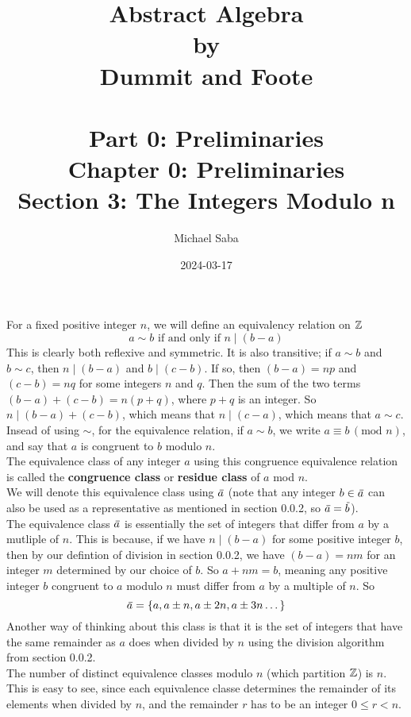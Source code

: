 \documentclass[12pt]{article}
\title{%
    \Huge Abstract Algebra \\
    \large by \\
    \Large Dummit and Foote \\~\\
    \huge Part 0: Preliminaries \\
    \LARGE Chapter 0: Preliminaries \\
    \Large Section 3: The Integers Modulo n
}
\date{2024-03-17}
\author{Michael Saba}
\begin{document}
    \maketitle
    \newpage    
    \setlength{\parindent}{0pt}

    For a fixed positive integer $n$,
    we will define an equivalency relation on $\mathbb{Z}$
    \[ a \sim b \text{ if and only if } n \mid (b - a) \]
    This is clearly both reflexive and symmetric.
    It is also transitive;
    if $a \sim b$ and $b \sim c$,
    then $n \mid (b-a)$ and $b \mid (c-b)$.
    If so, then $(b-a) = np$ and $(c-b) = nq$
    for some integers $n$ and $q$.
    Then the sum of the two terms $(b-a) + (c-b) = n(p+q)$,
    where $p+q$ is an integer.
    So $n \mid (b-a) + (c-b)$,
    which means that $n \mid (c-a)$,
    which means that $a \sim c$. \\
    Insead of using $\sim$,
    for the equivalence relation,
    if $a \sim b$,
    we write $a \equiv b \, (\text{mod }n)$,
    and say that $a$ is congruent to $b$ modulo $n$. \\
    The equivalence class of any integer $a$
    using this congruence equivalence relation
    is called the \textbf{congruence class} or \textbf{residue class}
    of $a$ mod $n$. \\
    We will denote this equivalence class using $\,\overline{\!{a}}$
    (note that any integer $b \in \,\overline{\!{a}}$ can also be used
    as a representative as mentioned in section 0.0.2,
    so $\,\overline{\!{a}} = \,\overline{\!{b}}$). \\

    The equivalence class $\,\overline{\!{a}}$ is essentially the set 
    of integers that differ from $a$ by a mutliple of $n$.
    This is because, if we have $n \mid (b - a)$
    for some positive integer $b$,
    then by our defintion of division in section 0.0.2,
    we have $(b-a) = nm$ for an integer $m$
    determined by our choice of $b$.
    So $a + nm = b$,
    meaning any positive integer $b$ congruent to $a$ modulo $n$
    must differ from $a$ by a multiple of $n$.
    So
    \[ \,\overline{\!{a}} = \{ a, a \pm n, a \pm 2n, a \pm 3n \dots \} \]
    Another way of thinking about this class is that it is the set
    of integers that have the same remainder as $a$ does
    when divided by $n$ using the division algorithm from section 0.0.2. \\

    The number of distinct equivalence classes modulo $n$
    (which partition $\mathbb{Z}$) is $n$.
    This is easy to see, since each equivalence classe
    determines the remainder of its elements when divided by $n$,
    and the remainder $r$ has to be an integer $0 \leqslant r < n$. \\
    
\end{document}
